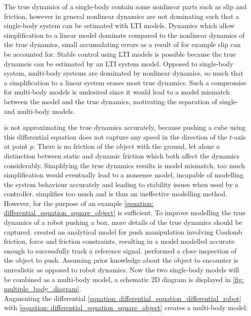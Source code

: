 The true dynamics of a single-body contain some nonlinear parts such as slip and friction, however in general nonlinear dynamics are not dominating such that a single-body system can be estimated with \ac{LTI} models. Dynamics which allow simplification to a linear model dominate compared to the nonlinear dynamics of the true dynamics, small accumulating errors as a result of for example slip can be accounted for. Stable control using \ac{LTI} models is possible because the true dynamcis can be estimated by an \ac{LTI} system model. Opposed to single-body system, multi-body systems are dominated by nonlinear dynamics, so much that a simplification to a linear system erases most true dynamics. Such a compromise for multi-body models is undesired since it would lead to a model mismatch between the model and the true dynamics, motivating the separation of single- and multi-body models.


 is not approximating the true dynamics accurately, because pushing a cube using this differential equation does not capture any speed in the direction of the $t$-axis at point $p$. There is no friction of the object with the ground, let alone a distinction between static and dynamic friction which both affect the dynamics considerably. Simplifying the true dynamics results is model mismatch, too much simplification would eventually lead to a nonsense model, incapable of modelling the system behaviour accurately and leading to stability issues when used by a controller.  simplifies too much and is thus an ineffective modelling method. However, for the purpose of an example \cref{equation: differential_equation_square_object} is sufficient. To improve modelling the true dynamics of a robot pushing a box, more details of the true dynamics should be captured. \cite{bauza_data-efficient_2018} created an analytical model for push manipulation involving Coulomb friction, force and friction constraints, resulting in a model modelled accurate enough to successfully track a reference signal. \cite{bauza_data-efficient_2018} performed a close inspection of the object to push. Assuming prior knowledge about the object to encounter is unrealistic as opposed to robot dynamics. Now the two single-body models will be combined as a multi-body model, a schematic 2D diagram is displayed in \cref{fig: multiple_body_diagram}. \\


Augmenting the differential \cref{equation: differential_equation_differential_robot} with \cref{equation: differential_equation_square_object} creates a multi-body model:


